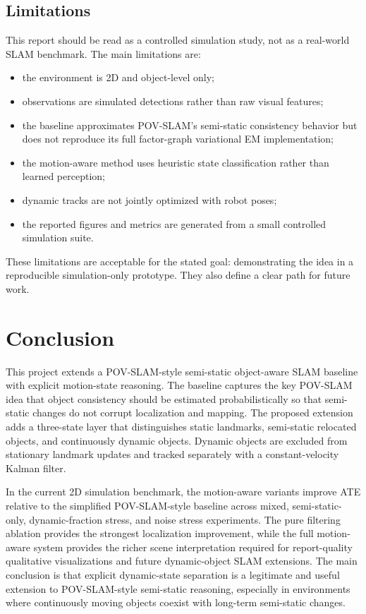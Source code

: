 ﻿\documentclass[11pt]{article}
\begin{document}
\subsection{Limitations}
This report should be read as a controlled simulation study, not as a real-world SLAM benchmark. The main limitations are:
\begin{itemize}[leftmargin=*]
    \item the environment is 2D and object-level only;
    \item observations are simulated detections rather than raw visual features;
    \item the baseline approximates POV-SLAM's semi-static consistency behavior but does not reproduce its full factor-graph variational EM implementation;
    \item the motion-aware method uses heuristic state classification rather than learned perception;
    \item dynamic tracks are not jointly optimized with robot poses;
    \item the reported figures and metrics are generated from a small controlled simulation suite.
\end{itemize}

These limitations are acceptable for the stated goal: demonstrating the idea in a reproducible simulation-only prototype. They also define a clear path for future work.

\section{Conclusion}
This project extends a POV-SLAM-style semi-static object-aware SLAM baseline with explicit motion-state reasoning. The baseline captures the key POV-SLAM idea that object consistency should be estimated probabilistically so that semi-static changes do not corrupt localization and mapping. The proposed extension adds a three-state layer that distinguishes static landmarks, semi-static relocated objects, and continuously dynamic objects. Dynamic objects are excluded from stationary landmark updates and tracked separately with a constant-velocity Kalman filter.

In the current 2D simulation benchmark, the motion-aware variants improve ATE relative to the simplified POV-SLAM-style baseline across mixed, semi-static-only, dynamic-fraction stress, and noise stress experiments. The pure filtering ablation provides the strongest localization improvement, while the full motion-aware system provides the richer scene interpretation required for report-quality qualitative visualizations and future dynamic-object SLAM extensions. The main conclusion is that explicit dynamic-state separation is a legitimate and useful extension to POV-SLAM-style semi-static reasoning, especially in environments where continuously moving objects coexist with long-term semi-static changes.
\end{document}
